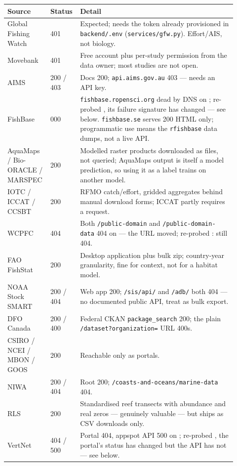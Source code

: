 \begin{wtable}
\centering
\tabscale
\caption{Tier 2: reachable but gated or bulk-download only. All probed
\ProbeDate{} unless a re-probe date is noted; \NTableRowsGated{} rows cover
\NTierTwo{} sources.}
\label{tab:gated}
\begin{tabular}{p{0.16\linewidth}p{0.10\linewidth}p{0.66\linewidth}}
\toprule
Source & Status & Detail \\
\midrule
Global Fishing Watch & 401 & Expected; needs the token already provisioned in \texttt{backend/.env} (\texttt{services/gfw.py}). Effort/AIS, not biology. \\
Movebank & 401 & Free account plus per-study permission from the data owner; most studies are not open. \\
AIMS & 200 / 403 & Docs 200; \texttt{api.aims.gov.au} 403 --- needs an API key. \\
FishBase & 000 & \texttt{fishbase.ropensci.org} dead by DNS on \ProbeDate{}; re-probed \AsOf{}, its failure signature has changed --- see below. \texttt{fishbase.se} serves 200 HTML only; programmatic use means the \texttt{rfishbase} data dumps, not a live API. \\
AquaMaps / Bio-ORACLE / MARSPEC & 200 & Modelled raster products downloaded as files, not queried; AquaMaps output is itself a model prediction, so using it as a label trains on another model. \\
IOTC / ICCAT / CCSBT & 200 & RFMO catch/effort, gridded aggregates behind manual download forms; ICCAT partly requires a request. \\
WCPFC & 404 & Both \texttt{/public-domain} and \texttt{/public-domain-data} 404 on \ProbeDate{} --- the URL moved; re-probed \AsOf{}: still 404. \\
FAO FishStat & 200 & Desktop application plus bulk zip; country-year granularity, fine for context, not for a habitat model. \\
NOAA Stock SMART & 200 / 404 & Web app 200; \texttt{/sis/api/} and \texttt{/adb/} both 404 --- no documented public API, treat as bulk export. \\
DFO Canada & 200 / 400 & Federal CKAN \texttt{package\_search} 200; the plain \texttt{/dataset?organization=} URL 400s. \\
CSIRO / NCEI / MBON / GOOS & 200 & Reachable only as portals. \\
NIWA & 200 / 404 & Root 200; \texttt{/coasts-and-oceans/marine-data} 404. \\
RLS & 200 & Standardised reef transects with abundance and real zeros --- genuinely valuable --- but ships as CSV downloads only. \\
VertNet & 404 / 500 & Portal 404, appspot API 500 on \ProbeDate{}; re-probed \AsOf{}, the portal's status has changed but the API has not --- see below. \\
\bottomrule
\end{tabular}
\end{wtable}

